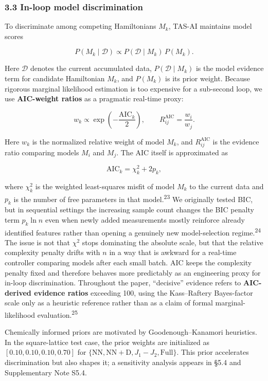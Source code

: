 \documentclass[
]{article}
\begin{document}
\hypertarget{in-loop-model-discrimination}{%
\subsubsection{3.3 In-loop model
discrimination}\label{in-loop-model-discrimination}}

To discriminate among competing Hamiltonians \(M_k\), TAS-AI maintains
model scores

\[
P(M_k\mid \mathcal D) \propto P(\mathcal D\mid M_k)\,P(M_k).
\]

Here \(\mathcal D\) denotes the current accumulated data,
\(P(\mathcal D\mid M_k)\) is the model evidence term for candidate
Hamiltonian \(M_k\), and \(P(M_k)\) is its prior weight. Because
rigorous marginal likelihood estimation is too expensive for a
sub-second loop, we use \textbf{AIC-weight ratios} as a pragmatic
real-time proxy:

\[
w_k \propto \exp\!\left(-\frac{\mathrm{AIC}_k}{2}\right),
\qquad
R_{ij}^{\mathrm{AIC}}=\frac{w_i}{w_j}.
\]

Here \(w_k\) is the normalized relative weight of model \(M_k\), and
\(R_{ij}^{\mathrm{AIC}}\) is the evidence ratio comparing models \(M_i\)
and \(M_j\). The AIC itself is approximated as

\[
\mathrm{AIC}_k = \chi^2_k + 2p_k,
\]

where \(\chi^2_k\) is the weighted least-squares misfit of model \(M_k\)
to the current data and \(p_k\) is the number of free parameters in that
model.\textsuperscript{23} We originally tested BIC, but in sequential
settings the increasing sample count changes the BIC penalty term
\(p_k \ln n\) even when newly added measurements mostly reinforce
already identified features rather than opening a genuinely new
model-selection regime.\textsuperscript{24} The issue is not that
\(\chi^2\) stops dominating the absolute scale, but that the relative
complexity penalty drifts with \(n\) in a way that is awkward for a
real-time controller comparing models after each small batch. AIC keeps
the complexity penalty fixed and therefore behaves more predictably as
an engineering proxy for in-loop discrimination. Throughout the paper,
``decisive'' evidence refers to \textbf{AIC-derived evidence ratios}
exceeding 100, using the Kass--Raftery Bayes-factor scale only as a
heuristic reference rather than as a claim of formal marginal-likelihood
evaluation.\textsuperscript{25}

Chemically informed priors are motivated by Goodenough--Kanamori
heuristics. In the square-lattice test case, the prior weights are
initialized as \([0.10,0.10,0.10,0.70]\) for
\(\{\mathrm{NN},\mathrm{NN{+}D},J_1\!-\!J_2,\mathrm{Full}\}\). This
prior accelerates discrimination but also shapes it; a sensitivity
analysis appears in §5.4 and Supplementary Note S5.4.
\end{document}
